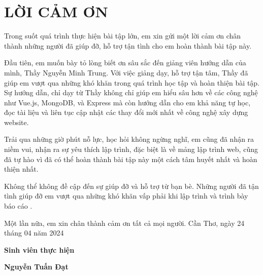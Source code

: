 \section*{LỜI CẢM ƠN}
Trong suốt quá trình thực hiện bài tập lớn, em xin gửi một lời cảm ơn chân thành những người đã giúp đỡ, hỗ trợ tận tình cho em hoàn thành bài tập này. \par
Đầu tiên, em muốn bày tỏ lòng biết ơn sâu sắc đến giảng viên hướng dẫn của mình, Thầy Nguyễn Minh Trung. Với việc giảng dạy, hỗ trợ tận tâm, Thầy đã giúp em vượt qua những khó khăn trong quá trình học tập và hoàn thiện bài tập. Sự hướng dẫn, chỉ dạy từ Thầy không chỉ giúp em hiểu sâu hơn về các công nghệ như Vue.js, MongoDB, và Express mà còn hướng dẫn cho em khả năng tự học, đọc tài liệu và liên tục cập nhật các thay đổi mới nhất về công nghệ xây dựng website. \par
Trải qua những giờ phút nỗ lực, học hỏi không ngừng nghĩ, em cũng đã nhận ra niềm vui, nhận ra sự yêu thích lập trình, đặc biệt là về mảng lập trình web, cũng đã tự hào vì đã có thể hoàn thành bài tập này một cách tâm huyết nhất và hoàn thiện nhất.\par
Không thể không đề cập đến sự giúp đỡ và hỗ trợ từ bạn bè. Những người đã tận tình giúp đỡ em vượt qua những khó khăn vấp phải khi lập trình và trình bày báo cáo
. \par
Một lần nữa, em xin chân thành cảm ơn tất cả mọi người.
\vspace{6pt}
\hspace{7cm}Cần Thơ, ngày 24 tháng 04 năm 2024

\hspace{9cm}\textbf{Sinh viên thực hiện}

\vspace{2cm}
\hspace{9.25cm}\textbf{Nguyễn Tuấn Đạt}
\thispagestyle{empty}
\newpage
